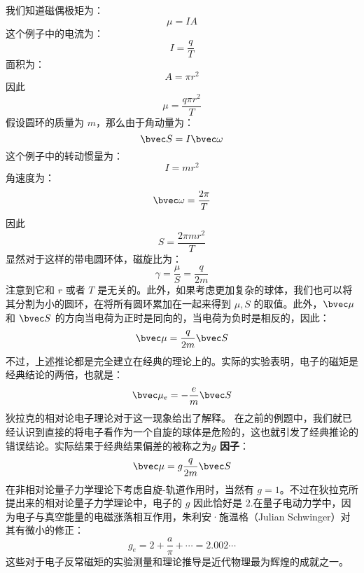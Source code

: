 我们知道磁偶极矩为：
\begin{equation}
\mu = IA
\end{equation}
这个例子中的电流为：
\begin{equation}
I=\frac{q}{T}
\end{equation}
面积为：
\begin{equation}
A= \pi r^2
\end{equation}
因此
\begin{equation}
\mu=\frac{q\pi r^2}{T}
\end{equation}
假设圆环的质量为 $m$，那么由于角动量为：
\begin{equation}
\bvec S = I\bvec\omega
\end{equation}
这个例子中的转动惯量为：
\begin{equation}
I = mr^2
\end{equation}
角速度为：
\begin{equation}
\bvec \omega = \frac{2\pi}{T}
\end{equation}
因此
\begin{equation}
S = \frac{2\pi m r^2}{T}
\end{equation}
显然对于这样的带电圆环体，磁旋比为：
\begin{equation}
\gamma = \frac{\mu}{S} = \frac{q}{2m}
\end{equation}
注意到它和 $r$ 或者 $T$ 是无关的。此外，如果考虑更加复杂的球体，我们也可以将其分割为小的圆环，在将所有圆环累加在一起来得到 $\mu,S$ 的取值。此外，$\bvec \mu$ 和 $\bvec S$ 的方向当电荷为正时是同向的，当电荷为负时是相反的，因此：
\begin{equation}
\bvec \mu = \frac{q}{2m}\bvec S
\end{equation}
不过，上述推论都是完全建立在经典的理论上的。实际的实验表明，电子的磁矩是经典结论的两倍，也就是：
\begin{equation}
\bvec \mu_e = -\frac{e}{m}\bvec S
\end{equation}
狄拉克的相对论电子理论对于这一现象给出了解释。
在之前的例题中，我们就已经认识到直接的将电子看作为一个自旋的球体是危险的，这也就引发了经典推论的错误结论。实际结果于经典结果偏差的被称之为\textbf{$g$ 因子}：
\begin{equation}\label{eq_HfineS_43}
\bvec \mu = g\frac{q}{2m}\bvec S
\end{equation}
在非相对论量子力学理论下考虑自旋-轨道作用时，当然有 $g=1$。不过在狄拉克所提出来的相对论量子力学理论中，电子的 $g$ 因此恰好是 $2$.在量子电动力学中，因为电子与真空能量的电磁涨落相互作用，朱利安·施温格（Julian Schwinger）对其有微小的修正：
\begin{equation}
g_e = 2+\frac{a}{\pi}+\cdots = 2.002\cdots
\end{equation}
这些对于电子反常磁矩的实验测量和理论推导是近代物理最为辉煌的成就之一。

